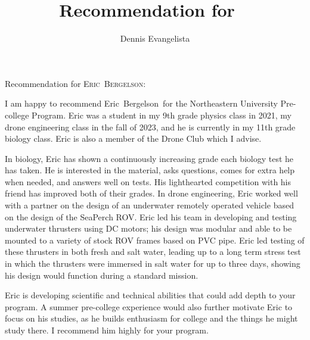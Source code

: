 \documentclass[12pt]{letter}
\title{Recommendation for \firstname\ \lastname}
\author{Dennis Evangelista}
\date{}
\newcommand\firstname{Eric}
\newcommand\lastname{Bergelson}
\begin{document}
\begin{letter}{%
}

\opening{Recommendation for {\scshape\firstname\ \lastname}:}

I am happy to recommend \firstname\ \lastname\ for the Northeastern University Pre-college Program. Eric was a student in my 9th grade physics class in 2021, my drone engineering class in the fall of 2023, and he is currently in my 11th grade biology class. Eric is also a member of the Drone Club which I advise.  

In biology, Eric has shown a continuously increasing grade each biology test he has taken.  He is interested in the material, asks questions, comes for extra help when needed, and answers well on tests. His lighthearted competition with his friend has improved both of their grades. In drone engineering, Eric worked well with a partner on the design of an underwater remotely operated vehicle based on the design of the SeaPerch ROV.  Eric led his team in developing and testing underwater thrusters using DC motors; his design was modular and able to be mounted to a variety of stock ROV frames based on PVC pipe. Eric led testing of these thrusters in both fresh and salt water, leading up to a long term stress test in which the thrusters were immersed in salt water for up to three days, showing his design would function during a standard mission. 

Eric is developing scientific and technical abilities that could add depth to your program. A summer pre-college experience would also further motivate Eric to focus on his studies, as he builds enthusiasm for college and the things he might study there. I recommend him highly for your program.  

\noclosing

\end{letter}
\end{document}
